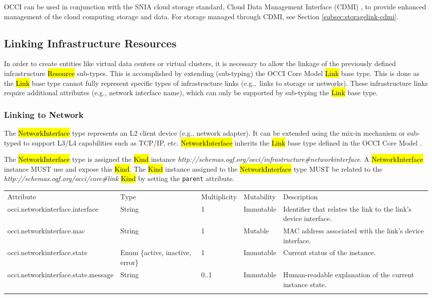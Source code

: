 \documentclass[10pt,a4paper]{article}
\begin{document}
OCCI can be used in conjunction with the SNIA cloud storage standard,
Cloud Data Management Interface (CDMI) \cite{cdmi}, to provide enhanced
management of the cloud computing storage and data. For storage
managed through CDMI, see Section \ref{subsec:storagelink-cdmi}.

\subsection{Linking Infrastructure Resources}
In order to create entities like virtual data centers or virtual
clusters, it is necessary to allow the linkage of the previously
defined infrastructure \hl{Resource} sub-types. This is accomplished
by extending (sub-typing) the OCCI Core Model \hl{Link} base type.
This is done as the \hl{Link} base type cannot fully represent
specific types of infrastructure links (e.g.,~links to storage or
networks).  These infrastructure links require additional attributes
(e.g., network interface name), which can only be supported by
sub-typing the \hl{Link} base type.

\subsubsection{Linking to Network}
The \hl{NetworkInterface} type represents an L2 client device (e.g.,
network adapter). It can be extended using the mix-in mechanism or
sub-typed to support L3/L4 capabilities such as TCP/IP, etc.
\hl{NetworkInterface} inherits the \hl{Link} base type defined in the
OCCI Core Model \cite{occi:core}.

The \hl{NetworkInterface} type is assigned the \hl{Kind} instance
\textit{http://schemas.ogf.org/occi/infrastructure\#networkinterface}.
A \hl{NetworkInterface} instance MUST use and expose this \hl{Kind}.
The \hl{Kind} instance assigned to the \hl{NetworkInterface} type MUST
be related to the \textit{http://schemas.ogf.org/occi/core\#link}
\hl{Kind} by setting the \texttt{parent} attribute.

{
	\begin{tabular}{lp{2.5cm}p{1cm}lp{5cm}}
	\toprule
	Attribute&Type&Multi\-plicity&Mutability&Description\\
	\colrule
	occi.networkinterface.interface & String & 1 & Immutable
	& Identifier that relates the link to the link's device interface.\\
	occi.networkinterface.mac & String & 1 & Mutable
	& MAC address associated with the link's device interface.\\
	occi.networkinterface.state & Enum \{active, inactive, error\}& 1
	& Immutable & Current status of the instance.\\
	occi.networkinterface.state.message & String & 0..1 & Immutable
	& Human-readable explanation of the current instance state.\\
	\botrule
	\end{tabular}
}
\end{document}
